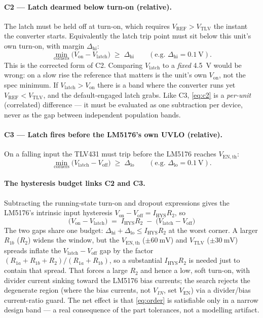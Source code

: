 \documentclass[11pt]{article}
\newcommand{\Ven}{V_{\mathrm{EN}}}
\newcommand{\Vref}{V_{\mathrm{REF}}}
\newcommand{\Vtlv}{V_{\mathrm{TLV}}}
\newcommand{\Vth}{V_{\mathrm{EN,th}}}
\newcommand{\Ihys}{I_{\mathrm{HYS}}}
\newcommand{\Rone}{R_{1a}}
\newcommand{\Rtwo}{R_{1b}}
\newcommand{\Rt}{R_{2}}
\begin{document}
\paragraph{C2 --- Latch dearmed below turn-on (relative).}
The latch must be held off at turn-on, which requires $\Vref>\Vtlv$ the instant the
converter starts. Equivalently the latch trip point must sit below this unit's own
turn-on, with margin $\Delta_{\mathrm{hi}}$:
\begin{equation}
\min_{\text{corners}}\big(V_{\mathrm{on}}-V_{\mathrm{latch}}\big)\;\ge\;\Delta_{\mathrm{hi}}
\qquad(\text{e.g.\ }\Delta_{\mathrm{hi}}=\SI{0.1}{\volt}).
\label{eq:c2}
\end{equation}
This is the corrected form of C2. Comparing $V_{\mathrm{latch}}$ to a \emph{fixed}
\SI{4.5}{\volt} would be wrong: on a slow rise the reference that matters is the unit's
own $V_{\mathrm{on}}$, not the spec minimum. If $V_{\mathrm{latch}}>V_{\mathrm{on}}$ there
is a band where the converter runs yet $\Vref<\Vtlv$, and the default-engaged latch grabs.
Like C3, \eqref{eq:c2} is a \emph{per-unit} (correlated) difference --- it must be
evaluated as one subtraction per device, never as the gap between independent population
bands.

\paragraph{C3 --- Latch fires before the LM5176's own UVLO (relative).}
On a falling input the TLV431 must trip before the LM5176 reaches $\Vth$:
\begin{equation}
\min_{\text{corners}}\big(V_{\mathrm{latch}}-V_{\mathrm{off}}\big)\;\ge\;\Delta_{\mathrm{lo}}
\qquad(\text{e.g.\ }\Delta_{\mathrm{lo}}=\SI{0.1}{\volt}).
\label{eq:c3}
\end{equation}

\paragraph{The hysteresis budget links C2 and C3.}
Subtracting the running-state turn-on and dropout expressions gives the LM5176's intrinsic
input hysteresis $V_{\mathrm{on}}-V_{\mathrm{off}}=\Ihys\Rt$, so
\begin{equation}
\boxed{\;\big(V_{\mathrm{on}}-V_{\mathrm{latch}}\big)\;=\;\Ihys\Rt\;-\;\big(V_{\mathrm{latch}}-V_{\mathrm{off}}\big)\;}
\label{eq:budget}
\end{equation}
The two gaps share one budget: $\Delta_{\mathrm{hi}}+\Delta_{\mathrm{lo}}\le\Ihys\Rt$ at the
worst corner. A larger $\Rtwo$ ($\Rt$) widens the window, but the $\Vth$ ($\pm\SI{60}{\milli\volt}$)
and $\Vtlv$ ($\pm\SI{30}{\milli\volt}$) spreads inflate the $V_{\mathrm{latch}}-V_{\mathrm{off}}$
gap by the factor $(\Rone+\Rtwo+\Rt)/(\Rone+\Rtwo)$, so a substantial $\Ihys\Rt$ is needed
just to contain that spread. That forces a large $\Rt$ and hence a low, soft turn-on, with
divider current sinking toward the LM5176 bias currents; the search rejects the degenerate
region (where the bias currents, not $V_{IN}$, set $\Ven$) via a divider/bias current-ratio
guard. The net effect is that \eqref{eq:order} is satisfiable only in a narrow design band
--- a real consequence of the part tolerances, not a modelling artifact.
\end{document}
